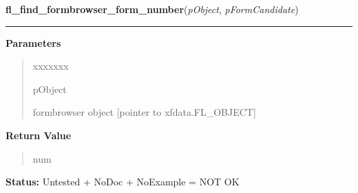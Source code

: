 \hspace{.8\funcindent}\begin{boxedminipage}{\funcwidth}

    \raggedright \textbf{fl\_find\_formbrowser\_form\_number}(\textit{pObject}, \textit{pFormCandidate})

    \vspace{-1.5ex}

    \rule{\textwidth}{0.5\fboxrule}
\setlength{\parskip}{2ex}
\setlength{\parskip}{1ex}
      \textbf{Parameters}
      \vspace{-1ex}

      \begin{quote}
        \begin{Ventry}{xxxxxxx}

          \item[pObject]

          formbrowser object [pointer to xfdata.FL\_OBJECT]

        \end{Ventry}

      \end{quote}

      \textbf{Return Value}
    \vspace{-1ex}

      \begin{quote}
      num

      \end{quote}

\textbf{Status:} Untested + NoDoc + NoExample = NOT OK



    \end{boxedminipage}

    \label{xformslib:library:fl_add_formbrowser}

    \vspace{0.5ex}

